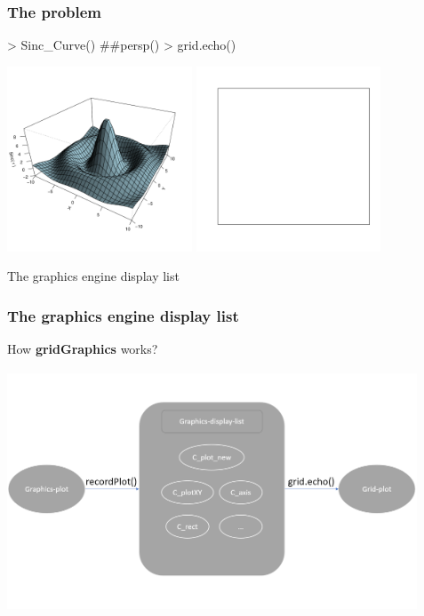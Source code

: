 \documentclass{beamer}
\begin{document}
\begin{frame}[fragile]
\frametitle{The problem}
\begin{Schunk}
\begin{Sinput}
> Sinc_Curve() ##persp()
> grid.echo()
\end{Sinput}
\end{Schunk}
\begin{center}
  \includegraphics[height = 5.5cm, width = 5.5cm]{plot/persp_1}
  \includegraphics[height = 5.5cm, width = 5.5cm]{plot/blank}
\end{center}
  
\end{frame}



\begin{frame}[fragile]
\begin{center}
  \Huge{The graphics engine display list}
\end{center}
\end{frame}



\begin{frame}[fragile]
\frametitle{The graphics engine display list}
How \textbf{gridGraphics} works?
\begin{center}
  \includegraphics[height = 7.2cm, width = 12.2cm]{plot/display_list.PNG}
\end{center}
\end{frame}
\end{document}
